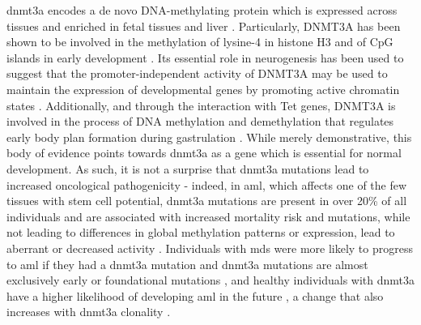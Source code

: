 \Ac{dnmt3a} encodes a de novo DNA-methylating protein \cite{Yanagisawa2002-op} which is expressed across tissues and enriched in fetal tissues and liver \cite{Robertson1999-dp}. Particularly, DNMT3A has been shown to be involved in the methylation of lysine-4 in histone H3 \cite{Ooi2007-pu} and of CpG islands in early development \cite{Smallwood2011-to}. Its essential role in neurogenesis has been used to suggest that the promoter-independent activity of DNMT3A may be used to maintain the expression of developmental genes by promoting active chromatin states \cite{Wu2010-ig}. Additionally, and through the interaction with Tet genes, DNMT3A is involved in the process of DNA methylation and demethylation that regulates early body plan formation during gastrulation \cite{Dai2016-kl}. While merely demonstrative, this body of evidence points towards \ac{dnmt3a} as a gene which is essential for normal development. As such, it is not a surprise that \ac{dnmt3a} mutations lead to increased oncological pathogenicity - indeed, in \ac{aml}, which affects one of the few tissues with stem cell potential, \ac{dnmt3a} mutations are present in over 20\% of all individuals and are associated with increased mortality risk \cite{Ley2010-yk} and mutations, while not leading to differences in global methylation patterns or expression, lead to aberrant or decreased activity \cite{Yan2011-ug}. Individuals with \ac{mds} were more likely to progress to \ac{aml} if they had a \ac{dnmt3a} mutation \cite{Walter2011-ua} and \ac{dnmt3a} mutations are almost exclusively early or foundational mutations \cite{Shlush2014-di,Miller2013-cw}, and healthy individuals with \ac{dnmt3a} have a higher likelihood of developing \ac{aml} in the future \cite{Gerstung2017-bm,Abelson2018-wh}, a change that also increases with \ac{dnmt3a} clonality \cite{Desai2018-pj}. 

